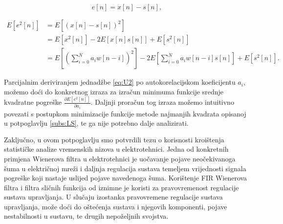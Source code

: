 \documentclass[a4paper,12pt,oneside]{memoir}
\begin{document}
            \begin{equation}
                e[n]=x[n]-s[n],
            \end{equation}
        
            \begin{equation}
                \begin{split}
                    E\left[e^2[n]\right]&=E\left[\left(x[n]-s[n]\right)^2\right] \\
                    & = E\left[x^2[n]\right]-2E\left[x[n]s[n]\right]+E\left[s^2[n]\right] \\
                    & = E\left[\left(\displaystyle\sum_{i=0}^{N}a_i w[n-i]\right)^2\right]-2E\left[\displaystyle\sum_{i=0}^{N}a_i w[n-i]s[n]\right]+E\left[s^2[n]\right].
                \end{split}
                \label{eq:U2}
            \end{equation}

            Parcijalnim deriviranjem jednadžbe \ref{eq:U2} po autokorelacijskom koeficijentu $a_i$, možemo doći do konkretnog izraza za izračun minimuma funkcije srednje kvadratne pogreške $\frac{\partial E[e^2[n]]}{\partial a_i}$. Daljnji proračun tog izraza možemo intuitivno povezati s postupkom minimizacije funkcije metode najmanjih kvadrata opisanoj u potpoglavlju \ref{subs:LS}, te ga nije potrebno dalje analizirati.
            
            Zaključno, u ovom potpoglavlju smo potvrdili tezu o korisnosti kroištenja statističke analize vremenskih nizova u elektrotehnici. Jedna od konkretnih primjena Wienerova filtra u elektrotehnici je uočavanje pojave neočekivanoga šuma u električnoj mreži i daljnja regulacija sustava temeljem vrijednosti signala pogreške koji nastaje uslijed pojave navedenoga šuma. Korištenje FIR Wienerova filtra i filtra sličnih funkcija od iznimne je koristi za pravovremenost regulacije sustava upravljanja. U slučaju izostanka pravovremene regulacije sustava upravljanja, može doći do oštećenja sustava i njegovih komponenti, pojave nestabilnosti u sustavu, te drugih nepoželjnih svojstva.

\end{document}
